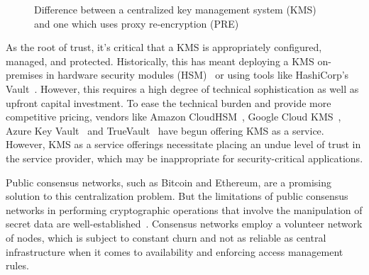 \documentclass[longbibliography,nofootinbib,twocolumn]{revtex4-1}
\begin{document}
\begin{figure}
    \centering
    \qquad
    \qquad
    \caption{Difference between a centralized key management system (KMS) and one which uses proxy re-encryption (PRE)}
    \label{fig:kms}
\end{figure}


As the root of trust, it's critical that a KMS is appropriately configured, managed, and protected.
Historically, this has meant deploying a KMS on-premises in hardware security modules (HSM)~\cite{wiki:hsm} or using tools like
HashiCorp's Vault~\cite{web:hashicorp-vault}.
However, this requires a high degree of technical sophistication as well as upfront capital investment.
To ease the technical burden and provide more competitive pricing, vendors like Amazon CloudHSM~\cite{web:aws-cloudhsm},
Google Cloud KMS~\cite{web:google-cloud-kms}, Azure Key Vault~\cite{web:azure-key-vault} and TrueVault~\cite{web:truevault}
have begun offering KMS as a service.
However, KMS as a service offerings necessitate placing an undue level of trust in the service provider, which may
be inappropriate for security-critical applications.

Public consensus networks, such as Bitcoin and Ethereum, are a promising solution to this centralization problem.
But the limitations of public consensus networks in performing cryptographic operations that involve the manipulation of secret
data are well-established~\cite{cryptoeprint:2017:201}. Consensus networks employ a volunteer network of nodes,
which is subject to constant churn and not as reliable as central infrastructure when it comes to availability and
enforcing access management rules.
\end{document}
